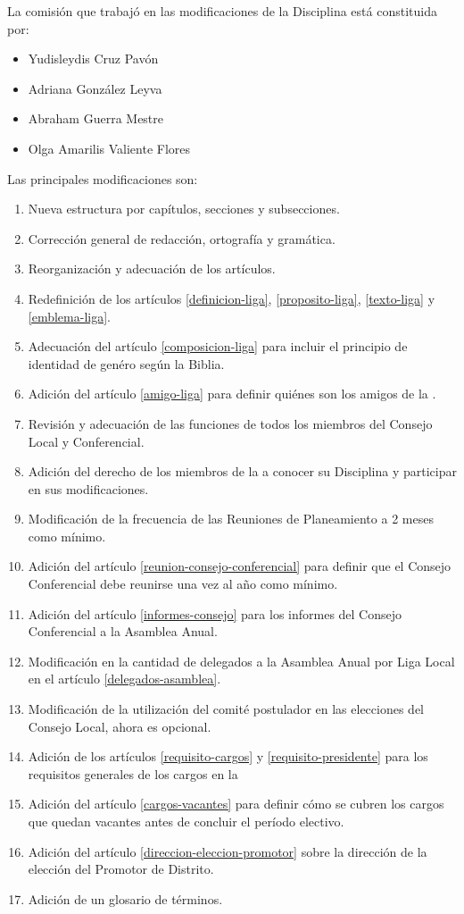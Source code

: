
La comisión que trabajó en las modificaciones de la Disciplina está constituida por:
\begin{itemize}
    \item Yudisleydis Cruz Pavón
    \item Adriana González Leyva
    \item Abraham Guerra Mestre
    \item Olga Amarilis Valiente Flores
\end{itemize}

Las principales modificaciones son:
\begin{enumerate}
    \item Nueva estructura por capítulos, secciones y subsecciones.
    \item Corrección general de redacción, ortografía y gramática.
    \item Reorganización y adecuación de los artículos.
    \item Redefinición de los artículos \ref{definicion-liga}, \ref{proposito-liga}, \ref{texto-liga} y \ref{emblema-liga}.
    \item Adecuación del artículo \ref{composicion-liga} para incluir el principio de identidad de genéro según la Biblia.
    \item Adición del artículo \ref{amigo-liga} para definir quiénes son los amigos de la \LMJ{}.
    \item Revisión y adecuación de las funciones de todos los miembros del Consejo Local y Conferencial.
    \item Adición del derecho de los miembros de la \LMJ{} a conocer su Disciplina y participar en sus modificaciones.
    \item Modificación de la frecuencia de las Reuniones de Planeamiento a 2 meses como mínimo.
    \item Adición del artículo \ref{reunion-consejo-conferencial} para definir que el Consejo Conferencial debe reunirse una vez al año como mínimo.
    \item Adición del artículo \ref{informes-consejo} para los informes del Consejo Conferencial a la Asamblea Anual.
    \item Modificación en la cantidad de delegados a la Asamblea Anual por Liga Local en el artículo \ref{delegados-asamblea}.
    \item Modificación de la utilización del comité postulador en las elecciones del Consejo Local, ahora es opcional.
    \item Adición de los artículos \ref{requisito-cargos} y \ref{requisito-presidente} para los requisitos generales de los cargos en la \LMJ{}
    \item Adición del artículo \ref{cargos-vacantes} para definir cómo se cubren los cargos que quedan vacantes antes de concluir el período electivo.
    \item Adición del artículo \ref{direccion-eleccion-promotor} sobre la dirección de la elección del Promotor de Distrito.
    \item Adición de un glosario de términos.
\end{enumerate}

